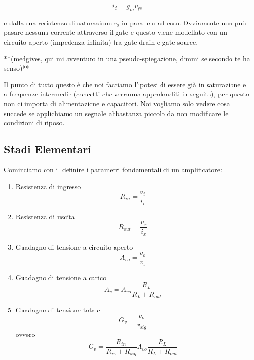 \documentclass[a4paper,twocolumn,notitlepage]{book}
\begin{document}
\begin{equation}
	i_{d}=g_{m}v_{gs}
\end{equation}

e dalla sua resistenza di saturazione $r_{o}$ in parallelo ad esso.
Ovviamente non può pasare nessuna corrente attraverso il gate e questo viene modellato con un circuito aperto (impedenza infinita) tra gate-drain e gate-source.

**(medgives, qui mi avventuro in una pseudo-spiegazione, dimmi se secondo te ha senso)**

Il punto di tutto questo è che noi facciamo l'ipotesi di essere già in saturazione e a frequenze intermedie (concetti che verranno approfonditi in seguito), per questo non ci importa di alimentazione e capacitori. Noi vogliamo solo vedere cosa succede se applichiamo un segnale abbastanza piccolo da non modificare le condizioni di riposo.

		\subsection*{Stadi Elementari}
Cominciamo con il definire i parametri fondamentali di un amplificatore:
		\begin{enumerate}
		\item
		Resistenza di ingresso
			\begin{equation}
			R_{in}=\frac{v_{i}}{i_{i}}
			\end{equation}
		\item
		Resistenza di uscita
			\begin{equation}
			R_{out}=\frac{v_{x}}{i_{x}}
			\end{equation}
		\item
		Guadagno di tensione a circuito aperto
			\begin{equation}
			A_{vo}=\frac{v_{o}}{v_{i}}
			\end{equation}
		\item
		Guadagno di tensione a carico
			\begin{equation}
			A_{v}=A_{vo}\frac{R_{L}}{R_{L}+R_{out}}
			\end{equation}
		\item
		Guadagno di tensione totale
			\begin{equation}
			G_{v}=\frac{v_{o}}{v_{sig}}
			\end{equation}
		ovvero
			\begin{equation}
			G_{v}=\frac{R_{in}}{R_{in}+R_{sig}} A_{vo} \frac{R_{L}}{R_{L}+R_{out}}
			\end{equation}
		\end{enumerate}	
		
\end{document}
